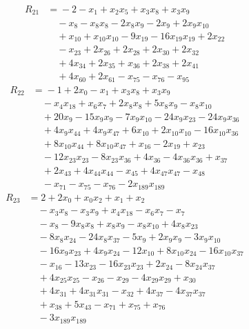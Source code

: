 \begin{align*}
R_{21}&={}-2 -x_{1} +x_{2}x_{5} +x_{3}x_{8} +x_{3}x_{9}\\
&\quad{}-x_{8} -x_{8}x_{8} -2x_{8}x_{9} -2x_{9} +2x_{9}x_{10}\\
&\quad{}+x_{10} +x_{10}x_{10} -9x_{19} -16x_{19}x_{19} +2x_{22}\\
&\quad{}-x_{23} +2x_{26} +2x_{28} +2x_{30} +2x_{32}\\
&\quad{}+4x_{34} +2x_{35} +x_{36} +2x_{38} +2x_{41}\\
&\quad{}+4x_{60} +2x_{61} -x_{75} -x_{76} -x_{95}
\end{align*}
\begin{align*}
R_{22}&={}-1 +2x_{0} -x_{1} +x_{3}x_{8} +x_{3}x_{9}\\
&\quad{}-x_{4}x_{18} +x_{6}x_{7} +2x_{8}x_{8} +5x_{8}x_{9} -x_{8}x_{10}\\
&\quad{}+20x_{9} -15x_{9}x_{9} -7x_{9}x_{10} -24x_{9}x_{23} -24x_{9}x_{36}\\
&\quad{}+4x_{9}x_{44} +4x_{9}x_{47} +6x_{10} +2x_{10}x_{10} -16x_{10}x_{36}\\
&\quad{}+8x_{10}x_{44} +8x_{10}x_{47} +x_{16} -2x_{19} +x_{23}\\
&\quad{}-12x_{23}x_{23} -8x_{23}x_{36} +4x_{36} -4x_{36}x_{36} +x_{37}\\
&\quad{}+2x_{43} +4x_{44}x_{44} -x_{45} +4x_{47}x_{47} -x_{48}\\
&\quad{}-x_{71} -x_{75} -x_{76} -2x_{189}x_{189}
\end{align*}
\begin{align*}
R_{23}&={}2 +2x_{0} +x_{0}x_{2} +x_{1} +x_{2}\\
&\quad{}-x_{3}x_{8} -x_{3}x_{9} +x_{4}x_{18} -x_{6}x_{7} -x_{7}\\
&\quad{}-x_{8} -9x_{8}x_{8} +x_{8}x_{9} -x_{8}x_{10} +4x_{8}x_{23}\\
&\quad{}-8x_{8}x_{24} -24x_{8}x_{37} -5x_{9} +2x_{9}x_{9} -3x_{9}x_{10}\\
&\quad{}-16x_{9}x_{23} +4x_{9}x_{24} -12x_{10} +8x_{10}x_{24} -16x_{10}x_{37}\\
&\quad{}-x_{16} -13x_{23} -16x_{23}x_{23} +2x_{24} -8x_{24}x_{37}\\
&\quad{}+4x_{25}x_{25} -x_{26} -x_{29} -4x_{29}x_{29} +x_{30}\\
&\quad{}+4x_{31} +4x_{31}x_{31} -x_{32} +4x_{37} -4x_{37}x_{37}\\
&\quad{}+x_{38} +5x_{43} -x_{71} +x_{75} +x_{76}\\
&\quad{}-3x_{189}x_{189}
\end{align*}
